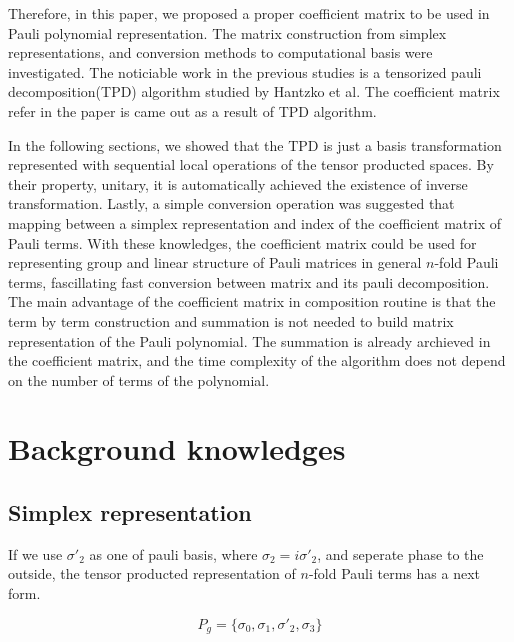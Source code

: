 \documentclass[twocolumn]{article}
\begin{document}
Therefore, in this paper, we proposed a proper coefficient matrix 
to be used in Pauli polynomial representation.
The matrix construction from simplex representations, 
and conversion methods to computational basis were investigated. 
The noticiable work in the previous studies is a tensorized pauli decomposition(TPD) algorithm studied by Hantzko et al\cite{hantzko_tensorized_2023}.
The coefficient matrix refer in the paper is came out as a result of TPD algorithm.

In the following sections, we showed that the TPD is just a basis transformation 
represented with sequential local operations of the tensor producted spaces. 
By their property, unitary, it is automatically achieved the existence of inverse transformation.
Lastly, a simple conversion operation was suggested that mapping between a simplex representation and index of the coefficient matrix
of Pauli terms.
With these knowledges, the coefficient matrix could be used for representing group and linear structure 
of Pauli matrices in general $n$-fold Pauli terms, fascillating fast conversion between matrix and its pauli decomposition.
The main advantage of the coefficient matrix in composition routine is that the term by term construction and summation is not 
needed to build matrix representation of the Pauli polynomial. The summation is already archieved in the coefficient matrix, 
and the time complexity of the algorithm does not depend on the number of terms of the polynomial. 


\section{Background knowledges}


\subsection{Simplex representation}

If we use $\sigma'_2$ as one of pauli basis, where $\sigma_2 = i \sigma'_2$,
and seperate phase to the outside,
the tensor producted representation of $n$-fold Pauli terms has a next form.

\begin{equation}
    P_{g} = \{\sigma_0 , \sigma_1, \sigma'_2, \sigma_3\}
\end{equation}
\end{document}

